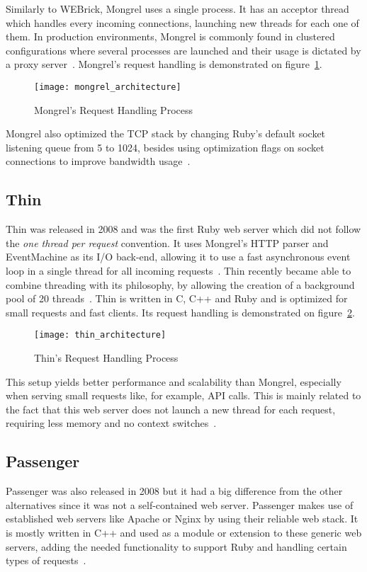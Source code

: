 Similarly to WEBrick, Mongrel uses a single process. It has an acceptor thread which handles every incoming connections, launching new threads for each one of them. In production environments, Mongrel is commonly found in clustered configurations where several processes are launched and their usage is dictated by a proxy server~\cite{mongrel_faq}. Mongrel's request handling is demonstrated on figure~\ref{fig:mongrel_architecture}.
\begin{figure}[h!t]
  \centering
  \caption{Mongrel's Request Handling Process}
  \label{fig:mongrel_architecture}
    \texttt{[image: mongrel\_architecture]}
\end{figure}
Mongrel also optimized the TCP stack by changing Ruby's default socket listening queue from 5 to 1024, besides using optimization flags on socket connections to improve bandwidth usage~\cite{mongrel_faq}.


\subsection{Thin}
Thin was released in 2008 and was the first Ruby web server which did not follow the \textit{one thread per request} convention. It uses Mongrel's HTTP parser and EventMachine as its I/O back-end, allowing it to use a fast asynchronous event loop in a single thread for all incoming requests~\cite{thin}. Thin recently became able to combine threading with its philosophy, by allowing the creation of a background pool of 20 threads~\cite{ruby_webservers}. Thin is written in C, C++ and Ruby and is optimized for small requests and fast clients. Its request handling is demonstrated on figure~\ref{fig:thin_architecture}.
\begin{figure}[h!t]
  \centering
  \caption{Thin's Request Handling Process}
  \label{fig:thin_architecture}
    \texttt{[image: thin\_architecture]}
\end{figure}
This setup yields better performance and scalability than Mongrel, especially when serving small requests like, for example, API calls. This is mainly related to the fact that this web server does not launch a new thread for each request, requiring less memory and no context switches~\cite{ruby_webservers}.
 

\subsection{Passenger}
Passenger was also released in 2008 but it had a big difference from the other alternatives since it was not a self-contained web server. Passenger makes use of established web servers like Apache or Nginx by using their reliable web stack. It is mostly written in C++ and used as a module or extension to these generic web servers, adding the needed functionality to support Ruby and handling certain types of requests~\cite{passenger_whatis}.

